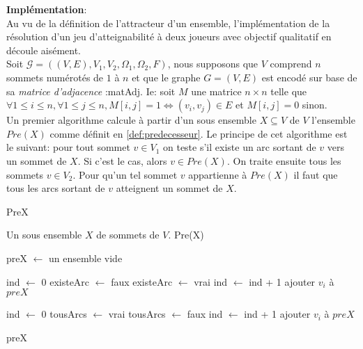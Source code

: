 \noindent\textbf{Implémentation}:\\

Au vu de la définition de l'attracteur d'un ensemble, l'implémentation de la résolution d'un jeu d'atteignabilité à deux joueurs avec objectif qualitatif en découle aisément. \\

Soit $\mathcal{G} = ((V,E),V_{1},V_{2},\Omega _{1}, \Omega _{2},F)$, nous supposons que $V$ comprend $n$ sommets numérotés de $1$ à $n$ et que le graphe $G = (V,E)$ est encodé sur base de sa \textit{matrice d'adjacence} :matAdj. Ie: soit $M$ une matrice $ n \times n $ telle que $ \forall 1 \leq i \leq n, \forall 1\leq j \leq n , M[i,j] = 1 \Leftrightarrow (v_{i},v_{j})\in E $ et $M[i,j] = 0$ sinon.\\

Un premier algorithme calcule à partir d'un sous ensemble $X \subseteq V$ de $V$ l'ensemble $Pre(X)$ comme définit en \ref{def:predecesseur}. Le principe de cet algorithme est le suivant: pour tout sommet $v\in V_{1}$ on teste s'il existe un arc sortant de $v$ vers un sommet de $X$. Si c'est le cas, alors $v\in Pre(X)$. On traite ensuite tous les sommets $v \in V_{2}$. Pour qu'un tel sommet $v$ appartienne à $Pre(X)$ il faut que tous les arcs sortant de $v$ atteignent un sommet de $X$.

\begin{algorithm}
	\caption{PreX}
	\begin{algorithmic}
		\REQUIRE Un sous ensemble $X$ de sommets de $V$.
		\ENSURE Pre(X)
		
		\STATE preX $\leftarrow$ un ensemble vide
		
			\STATE ind $\leftarrow$ 0
			\STATE existeArc $\leftarrow$ faux
					\STATE existeArc $\leftarrow$ vrai
				\ELSE
					\STATE ind $\leftarrow$ ind + 1
				\ENDIF
			\ENDWHILE
				\STATE ajouter $v_{i}$ à $preX$
			\ENDIF
		\ENDFOR
		
			\STATE ind $\leftarrow$ 0
			\STATE tousArcs $\leftarrow$ vrai
					\STATE tousArcs $\leftarrow$ faux
				\ELSE
					\STATE ind $\leftarrow$ ind + 1
				\ENDIF
			\ENDWHILE
				\STATE ajouter $v_{i}$ à $preX$
			\ENDIF
		\ENDFOR
		
		\RETURN preX
			
\end{algorithmic}
		
\end{algorithm}

